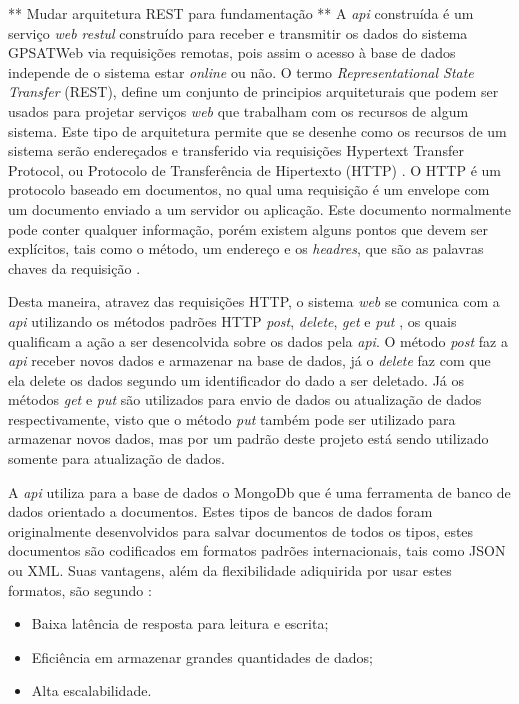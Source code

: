         ** Mudar arquitetura REST para fundamentação **
        A \textit{api} construída é um serviço \textit{web restul} construído para receber e transmitir os dados do sistema GPSATWeb via requisições remotas, pois assim o acesso à base de dados independe de o sistema estar \textit{online} ou não. O termo \textit{Representational State Transfer} (REST), define um conjunto de principios arquiteturais que podem ser usados para projetar serviços \textit{web} que trabalham com os recursos de algum sistema. Este tipo de arquitetura permite que se desenhe como os recursos de um sistema serão endereçados e transferido via requisições Hypertext Transfer Protocol, ou Protocolo de Transferência de Hipertexto (HTTP) \cite{Rodriguez2008}. O HTTP é um protocolo baseado em documentos, no qual uma requisição é um envelope com um documento enviado a um servidor ou aplicação. Este documento normalmente pode conter qualquer informação, porém existem alguns pontos que devem ser explícitos, tais como o método, um endereço e os \textit{headres}, que são as palavras chaves da requisição \cite{Masse2011}.

        Desta maneira, atravez das requisições HTTP, o sistema \textit{web} se comunica com a \textit{api} utilizando os métodos padrões HTTP \textit{post}, \textit{delete}, \textit{get} e \textit{put} \cite{Rodriguez2008}, os quais qualificam a ação a ser desencolvida sobre os dados pela \textit{api}. O método \textit{post} faz a \textit{api} receber novos dados e armazenar na base de dados, já o \textit{delete} faz com que ela delete os dados segundo um identificador do dado a ser deletado. Já os métodos \textit{get} e \textit{put} são utilizados para envio de dados ou atualização de dados respectivamente, visto que o método \textit{put} também pode ser utilizado para armazenar novos dados, mas por um padrão deste projeto está sendo utilizado somente para atualização de dados.

        A \textit{api} utiliza para a base de dados o MongoDb que é uma ferramenta de banco de dados orientado a documentos. Estes tipos de bancos de dados foram originalmente desenvolvidos para salvar documentos de todos os tipos, estes documentos são codificados em formatos padrões internacionais, tais como JSON ou XML. Suas vantagens, além da flexibilidade adiquirida por usar estes formatos, são segundo \cite{Moniruzzaman2013}:
            \begin{itemize}
                \item Baixa latência de resposta para leitura e escrita;
                \item Eficiência em armazenar grandes quantidades de dados;
                \item Alta escalabilidade.
            \end{itemize}
        

